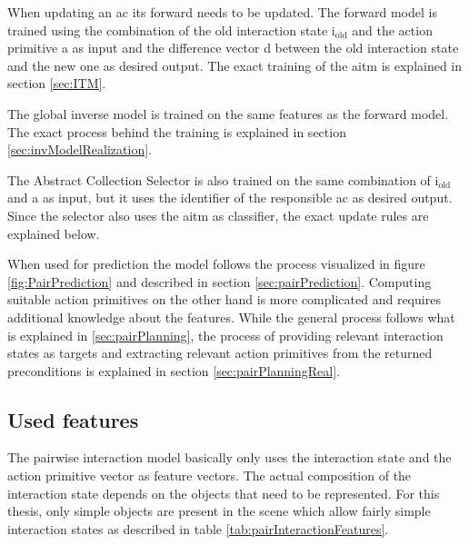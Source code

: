 When updating an \gls{ac} its forward needs to be updated. The forward model is trained using the combination of the old interaction state  i$_\text{old}$ and the action primitive a as input and the difference vector d between the old interaction state and the new one as desired output. The exact training of the \gls{aitm} is explained in section \ref{sec:ITM}. 

The global inverse model is trained on the same features as the forward model. The exact process behind the training is explained in section \ref{sec:invModelRealization}.

The Abstract Collection Selector is also trained on the same combination of i$_\text{old}$ and a as input, but it uses the identifier of the responsible \gls{ac} as desired output.
Since the selector also uses the \gls{aitm} as classifier, the exact update rules are explained below.

When used for prediction the model follows the process visualized in figure \ref{fig:PairPrediction} and described in section \ref{sec:pairPrediction}.
Computing suitable action primitives on the other hand is more complicated and requires additional knowledge about the features. While the general process follows what is explained in \ref{sec:pairPlanning}, the process of providing relevant interaction states as targets and extracting relevant action primitives from the returned preconditions is explained in section \ref{sec:pairPlanningReal}.



\subsection{Used features \label{sec:intFeatures}}

The pairwise interaction model basically only uses the interaction state and the action primitive vector as feature vectors. The actual composition of the interaction state depends on the objects that need to be represented. For this thesis, only simple objects are present in the scene which allow fairly simple interaction states as described in table \ref{tab:pairInteractionFeatures}.

